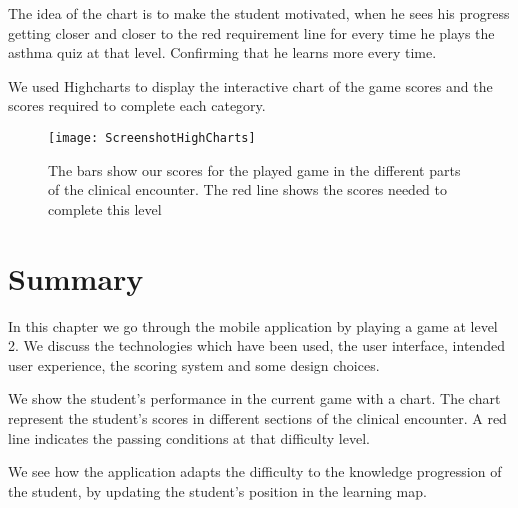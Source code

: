 The idea of the chart is to make the student motivated, when he sees his progress getting closer and closer to the red requirement line for every time he plays the asthma quiz at that level. Confirming that he learns more every time.

We used Highcharts \parencite{Highsoft} to display the interactive chart of the game scores and the scores required to complete each category.

\begin{figure}[h!]
	\texttt{[image: ScreenshotHighCharts]}
	\caption {The bars show our scores for the played game in the different parts of the clinical encounter. The red line shows the scores needed to complete this level}
	\label{fig:ScreenshotHighCharts}
\end{figure}

\section{Summary}
In this chapter we go through the mobile application by playing a game at level 2. We discuss the technologies which have been used, the user interface, intended user experience, the scoring system and some design choices. 

We show the student's performance in the current game with a chart. The chart represent the student's scores in different sections of the clinical encounter. A red line indicates the passing conditions at that difficulty level.

We see how the application adapts the difficulty to the knowledge progression of the student, by updating the student's position in the learning map.
	